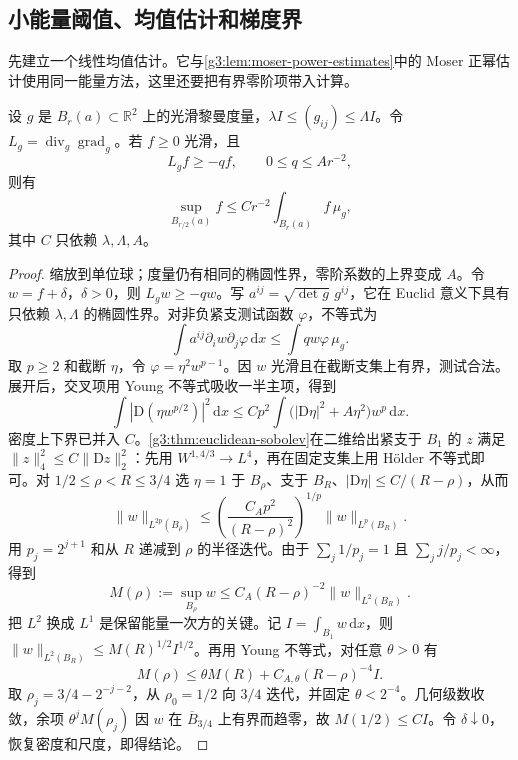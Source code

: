 \subsection{小能量阈值、均值估计和梯度界}
\label{g3:subsec:1803:03}
先建立一个线性均值估计。它与\cref{g3:lem:moser-power-estimates}中的 Moser 正幂估计使用同一能量方法，这里还要把有界零阶项带入计算。

\begin{lemma}\label{g3:lem:surface-subsolution-mean}
	设 \(g\) 是 \(B_r(a)\subset\mathbb R^2\) 上的光滑黎曼度量，\(\lambda I\le(g_{ij})\le\Lambda I\)。令 \(L_g=\operatorname{div}_g\operatorname{grad}_g\)。若 \(f\ge0\) 光滑，且
	\[
		L_gf\ge-qf,\qquad 0\le q\le A r^{-2},
	\]
	则有
	\[
		\sup_{B_{r/2}(a)}f\le C r^{-2}\int_{B_r(a)}f\,\mu_g,
	\]
	其中 \(C\) 只依赖 \(\lambda,\Lambda,A\)。
\end{lemma}
\begin{proof}
	缩放到单位球；度量仍有相同的椭圆性界，零阶系数的上界变成 \(A\)。令 \(w=f+\delta\)，\(\delta>0\)，则 \(L_gw\ge-qw\)。写 \(a^{ij}=\sqrt{\det g}\,g^{ij}\)，它在 Euclid 意义下具有只依赖 \(\lambda,\Lambda\) 的椭圆性界。对非负紧支测试函数 \(\varphi\)，不等式为
	\[
		\int a^{ij}\partial_iw\partial_j\varphi\,\mathrm dx
		\le\int q w\varphi\,\mu_g.
	\]
	取 \(p\ge2\) 和截断 \(\eta\)，令 \(\varphi=\eta^2w^{p-1}\)。因 \(w\) 光滑且在截断支集上有界，测试合法。展开后，交叉项用 Young 不等式吸收一半主项，得到
	\[
		\int|\mathrm D(\eta w^{p/2})|^2\,\mathrm dx
		\le Cp^2\int\bigl(|\mathrm D\eta|^2+A\eta^2\bigr)w^p\,\mathrm dx.
	\]
	密度上下界已并入 \(C\)。\cref{g3:thm:euclidean-sobolev}在二维给出紧支于 \(B_1\) 的 \(z\) 满足 \(\|z\|_4^2\le C\|\mathrm Dz\|_2^2\)：先用 \(W^{1,4/3}\to L^4\)，再在固定支集上用 Hölder 不等式即可。对 \(1/2\le\rho<R\le3/4\) 选 \(\eta=1\) 于 \(B_\rho\)、支于 \(B_R\)、\(|\mathrm D\eta|\le C/(R-\rho)\)，从而
	\[
		\|w\|_{L^{2p}(B_\rho)}
		\le\left(\frac{C_Ap^2}{(R-\rho)^2}\right)^{1/p}\|w\|_{L^p(B_R)}.
	\]
	用 \(p_j=2^{j+1}\) 和从 \(R\) 递减到 \(\rho\) 的半径迭代。由于 \(\sum_j1/p_j=1\) 且 \(\sum_jj/p_j<\infty\)，得到
	\[
		M(\rho):=\sup_{B_\rho}w
		\le C_A(R-\rho)^{-2}\|w\|_{L^2(B_R)}.
	\]
	把 \(L^2\) 换成 \(L^1\) 是保留能量一次方的关键。记 \(I=\int_{B_1}w\,\mathrm dx\)，则 \(\|w\|_{L^2(B_R)}\le M(R)^{1/2}I^{1/2}\)。再用 Young 不等式，对任意 \(\theta>0\) 有
	\[
		M(\rho)\le\theta M(R)+C_{A,\theta}(R-\rho)^{-4}I.
	\]
	取 \(\rho_j=3/4-2^{-j-2}\)，从 \(\rho_0=1/2\) 向 \(3/4\) 迭代，并固定 \(\theta<2^{-4}\)。几何级数收敛，余项 \(\theta^jM(\rho_j)\) 因 \(w\) 在 \(\overline B_{3/4}\) 上有界而趋零，故 \(M(1/2)\le CI\)。令 \(\delta\downarrow0\)，恢复密度和尺度，即得结论。
\end{proof}

